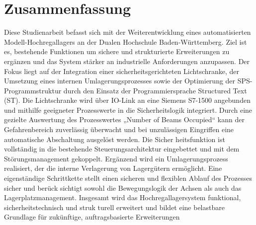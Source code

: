 \section*{Zusammenfassung} 
Diese Studienarbeit befasst sich mit der Weiterentwicklung eines automatisierten
Modell-Hochregallagers an der Dualen Hochschule Baden-Württemberg. Ziel ist es,
bestehende Funktionen um sichere und strukturierte Erweiterungen zu ergänzen und
das System stärker an industrielle Anforderungen anzupassen. Der Fokus liegt auf der
Integration einer sicherheitsgerichteten Lichtschranke, der Umsetzung eines internen
Umlagerungsprozesses sowie der Optimierung der SPS-Programmstruktur durch den
Einsatz der Programmiersprache Structured Text (ST). Die Lichtschranke wird über
IO-Link an eine Siemens S7-1500 angebunden und mithilfe geeigneter Prozesswerte
in die Sicherheitslogik integriert. Durch eine gezielte Auswertung des Prozesswertes
„Number of Beams Occupied“ kann der Gefahrenbereich zuverlässig überwacht und bei
unzulässigen Eingriffen eine automatische Abschaltung ausgelöst werden. Die Sicher
heitsfunktion ist vollständig in die bestehende Steuerungsarchitektur eingebettet und
mit dem Störungsmanagement gekoppelt. Ergänzend wird ein Umlagerungsprozess
realisiert, der die interne Verlagerung von Lagergütern ermöglicht. Eine eigenständige
Schrittkette stellt einen sicheren und flexiblen Ablauf des Prozesses sicher und berück
sichtigt sowohl die Bewegungslogik der Achsen als auch das Lagerplatzmanagement.
Insgesamt wird das Hochregallagersystem funktional, sicherheitstechnisch und struk
turell erweitert und bildet eine belastbare Grundlage für zukünftige, auftragsbasierte
Erweiterungen